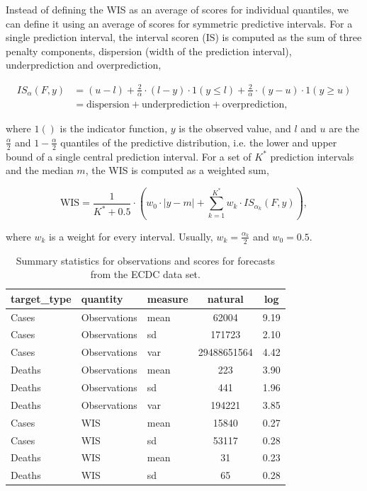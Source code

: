 \documentclass{article}
\begin{document}
Instead of defining the WIS as an average of scores for individual quantiles, we can define it using an average of scores for symmetric predictive intervals. For a single prediction interval, the interval scoren (IS) is computed as the sum of three penalty components, dispersion (width of the prediction interval), underprediction and overprediction,  
%
\begin{linenomath*}
\begin{align*}
 IS_\alpha(F,y) &= (u-l) + \frac{2}{\alpha} \cdot (l-y) \cdot 1(y \leq l) + \frac{2}{\alpha} \cdot (y-u) \cdot 1(y \geq u) \\
 &= \text{dispersion} + \text{underprediction} + \text{overprediction},    
\end{align*}
\end{linenomath*}
%
where $1()$ is the indicator function, $y$ is the observed value, and $l$ and $u$ are the $\frac{\alpha}{2}$ and $1 - \frac{\alpha}{2}$ quantiles of the predictive distribution, i.e. the lower and upper bound of a single central prediction interval. For a set of $K^*$ prediction intervals and the median $m$, the WIS is computed as a weighted sum, 
\begin{linenomath*}
\begin{equation*}
\text{WIS} = \frac{1}{K^* + 0.5} \cdot \left(w_0 \cdot |y - m| + \sum_{k = 1}^{K^*} w_k \cdot IS_{\alpha_{k}}(F, y)\right),    
\end{equation*} 
\end{linenomath*}
where $w_k$ is a weight for every interval. Usually, $w_k = \frac{\alpha_k}{2}$ and $w_0 = 0.5$. 



\begin{table}[h!]
    \centering


\begin{tabular}{lllcc}
\toprule
target\_type & quantity & measure & natural & log\\
\midrule
Cases & Observations & mean & 62004 & 9.19\\
Cases & Observations & sd & 171723 & 2.10\\
Cases & Observations & var & 29488651564 & 4.42\\
\addlinespace
Deaths & Observations & mean & 223 & 3.90\\
Deaths & Observations & sd & 441 & 1.96\\
Deaths & Observations & var & 194221 & 3.85\\
\addlinespace
\hline
\addlinespace
Cases & WIS & mean & 15840 & 0.27\\
Cases & WIS & sd & 53117 & 0.28\\
\addlinespace
Deaths & WIS & mean & 31 & 0.23\\
Deaths & WIS & sd & 65 & 0.28\\
\bottomrule
\end{tabular}
    \caption{Summary statistics for observations and scores for forecasts from the ECDC data set.}
    \label{tab:HUB-summary}
\end{table}
\end{document}
